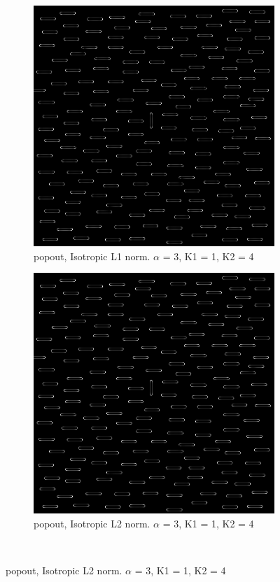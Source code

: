 \begin{figure}[H]
\centering

  \begin{subfigure}{.7\textwidth}
    \centering
    \includegraphics[width=.9\textwidth]{./canny/popout_L1_a3_k11_k24}
    \caption{popout, Isotropic L1 norm. $\alpha$ = 3, K1 = 1, K2 = 4}
    \label{fig:popout_L1_a3_k11_k24}
  \end{subfigure}%
  
  \begin{subfigure}{.7\textwidth}
    \centering
    \includegraphics[width=.9\textwidth]{./canny/popout_L2_a3_k11_k24}
    \caption{popout, Isotropic L2 norm. $\alpha$ = 3, K1 = 1, K2 = 4}
    \label{fig:popout_L2_a3_k11_k24}
  \end{subfigure}\\%
 \end{figure}

